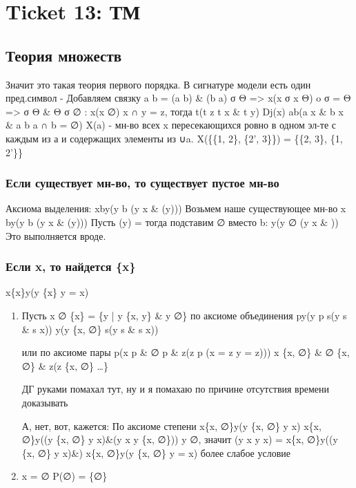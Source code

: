 \section{Ticket 13: ТМ}
\label{sec-15}
\subsection{Теория множеств}
\label{sec-15-1}
   Значит это такая теория первого порядка.
   В сигнатуре модели есть один пред.символ - \in
   Добавляем связку a \leftrightarrow b = (a \to b) \& (b \to a)
   σ \in Θ => \forall x(x \in σ \to x \in Θ)
o   σ = Θ => σ \in Θ \& Θ \in σ
   ∅ : \forall x(\lnot x \in ∅)
   x ∩ y = z, тогда \forall t(t \in z \leftrightarrow t \in x \& t \in y)
   Dj(x) \forall a\forall b(a \in x \& b \in x \& a \ne  b \to a ∩ b = ∅)
   X(a) - мн-во всех x пересекающихся ровно в одном эл-те с каждым из а
   и содержащих элементы из ∪a.
   X(\{\{1, 2\}, \{2', 3\}\}) = \{\{2, 3\}, \{1, 2'\}\}
\subsubsection{Если существует мн-во, то существует пустое мн-во}
\label{sec-15-1-1}
Аксиома выделения:
\forall x\exists b\forall y(y \in b \leftrightarrow (y \in x \& \phi(y)))
Возьмем наше существующее мн-во x
\exists b\forall y(y \in b \leftrightarrow (y \in x \& \phi(y)))
Пусть \phi(y) = \bot
тогда подставим ∅ вместо b:
\forall y(y \in ∅ \leftrightarrow (y \in x \& \bot))
Это выполняется вроде.
\subsubsection{Если x, то найдется \{x\}}
\label{sec-15-1-2}
\forall x\exists \{x\}\forall y(y \in \{x\} \to y = x)
\begin{enumerate}
\item Пусть x \ne  ∅
\{x\} = \{y | y \in \{x, y\} \& y \ne  ∅\}
по аксиоме объединения \exists p\forall y(y \in p \leftrightarrow \exists s(y \in s \& s \in x))
\forall y(y \in \{x, ∅\} \leftrightarrow \exists s(y \in s \& s \in x))

или по аксиоме пары
\exists p(x \in p \& ∅ \in p \& \forall z(z \in p \to (x = z \lor y = z)))
x \in \{x, ∅\} \& ∅ \in \{x, ∅\} \& \forall z(z \in \{x, ∅\} \to \dots \}

ДГ руками помахал тут, ну и я помахаю по причине
отсутствия времени доказывать

А, нет, вот, кажется:
По аксиоме степени \forall x\exists \{x, ∅\}\forall y(y \in \{x, ∅\} \leftrightarrow y \in x)
\forall x\exists \{x, ∅\}\forall y((y \in \{x, ∅\} \to y \in x)\&(y \in x \to y \in \{x, ∅\}))
\lnot y \in ∅, значит (y \in x \to y \in x) = \top
\forall x\exists \{x, ∅\}\forall y((y \in \{x, ∅\} \to y \in x)\&\top)
\forall x\exists \{x, ∅\}\forall y(y \in \{x, ∅\} \to y = x)   более слабое условие
\item x = ∅
P(∅) = \{∅\}
\end{enumerate}
